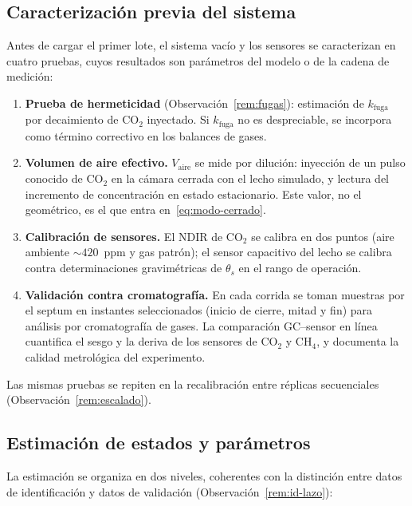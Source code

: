 \subsection{Caracterización previa del sistema}\label{sec:caracterizacion}

Antes de cargar el primer lote, el sistema vacío y los sensores se
caracterizan en cuatro pruebas, cuyos resultados son parámetros del
modelo o de la cadena de medición:

\begin{enumerate}
  \item \textbf{Prueba de hermeticidad} (Observación~\ref{rem:fugas}):
  estimación de $k_{\mathrm{fuga}}$ por decaimiento de CO$_2$ inyectado.
  Si $k_{\mathrm{fuga}}$ no es despreciable, se incorpora como término
  correctivo en los balances de gases.
  \item \textbf{Volumen de aire efectivo.} $V_{\mathrm{aire}}$ se mide
  por dilución: inyección de un pulso conocido de CO$_2$ en la cámara
  cerrada con el lecho simulado, y lectura del incremento de
  concentración en estado estacionario. Este valor, no el geométrico,
  es el que entra en~\eqref{eq:modo-cerrado}.
  \item \textbf{Calibración de sensores.} El NDIR de CO$_2$ se calibra
  en dos puntos (aire ambiente $\sim 420$~ppm y gas patrón); el sensor
  capacitivo del lecho se calibra contra determinaciones gravimétricas
  de $\theta_s$ en el rango de operación.
  \item \textbf{Validación contra cromatografía.} En cada corrida se
  toman muestras por el septum en instantes seleccionados (inicio de
  cierre, mitad y fin) para análisis por cromatografía de gases. La
  comparación GC--sensor en línea cuantifica el sesgo y la deriva de
  los sensores de CO$_2$ y CH$_4$, y documenta la calidad metrológica
  del experimento.
\end{enumerate}

Las mismas pruebas se repiten en la recalibración entre réplicas
secuenciales (Observación~\ref{rem:escalado}).

\subsection{Estimación de estados y parámetros}\label{sec:estimacion}

La estimación se organiza en dos niveles, coherentes con la distinción
entre datos de identificación y datos de validación
(Observación~\ref{rem:id-lazo}):


